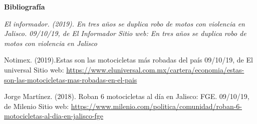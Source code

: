 \documentclass[12pt]{article}
\begin{document}

\par

\vspace{\baselineskip}

\vspace{\baselineskip}


\vspace{\baselineskip}

\vspace{\baselineskip}
\textbf{Bibliografía }\par

\textit{El informador. (2019). En tres años se duplica robo de motos con violencia en Jalisco. 09/10/19, de El Informador Sitio web: En tres años se duplica robo de motos con violencia en Jalisco}\par

Notimex. (2019).Estas son las motocicletas más robadas del país 09/10/19, de El universal Sitio web: \href{https://www.eluniversal.com.mx/cartera/economia/estas-son-las-motocicletas-mas-robadas-en-el-pais}{https://www.eluniversal.com.mx/cartera/economia/estas-son-las-motocicletas-mas-robadas-en-el-pais}\par

Jorge Martínez. (2018). Roban 6 motocicletas al día en Jalisco: FGE. 09/10/19, de Milenio Sitio web: \href{https://www.milenio.com/politica/comunidad/roban-6-motocicletas-al-dia-en-jalisco-fge}{https://www.milenio.com/politica/comunidad/roban-6-motocicletas-al-dia-en-jalisco-fge}\par


\printbibliography
\end{document}
